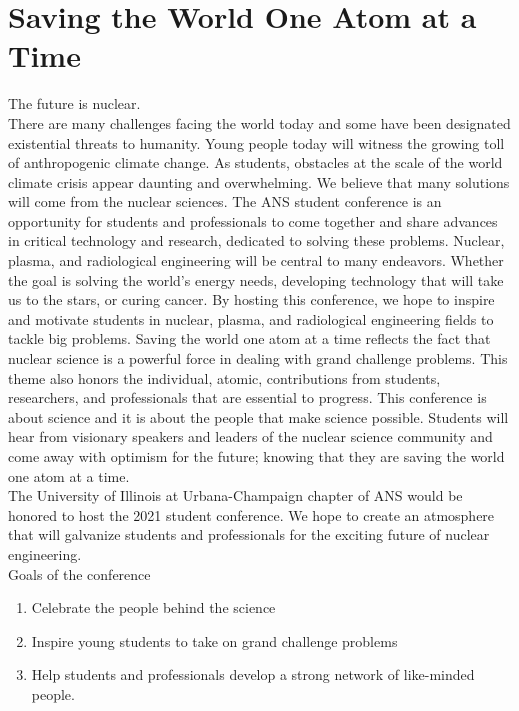 \section{Saving the World One Atom at a Time}
The future is nuclear.\\
There are many challenges facing the world today and some have been designated existential threats to humanity. Young people today will witness the growing toll of anthropogenic climate change. As students, obstacles at the scale of the world climate crisis appear daunting and overwhelming. We believe that many solutions will come from the nuclear sciences. The ANS student conference is an opportunity for students and professionals to come together and share advances in critical technology and research, dedicated to solving these problems. Nuclear, plasma, and radiological engineering will be central to many endeavors. Whether the goal is solving the world’s energy needs, developing technology that will take us to the stars, or curing cancer. By hosting this conference, we hope to inspire and motivate students in nuclear, plasma, and radiological engineering fields to tackle big problems. Saving the world one atom at a time reflects the fact that nuclear science is a powerful force in dealing with grand challenge problems. This theme also honors the individual, atomic, contributions from students, researchers, and professionals that are essential to progress. This conference is about science and it is about the people that make science possible. Students will hear from visionary speakers and leaders of the nuclear science community and come away with optimism for the future; knowing that they are saving the world one atom at a time.\\
The University of Illinois at Urbana-Champaign chapter of ANS would be honored to host the 2021 student conference. We hope to create an atmosphere that will galvanize students and professionals for the exciting future of nuclear engineering.\\

Goals of the conference
\begin{enumerate}
	\item Celebrate the people behind the science
	\item Inspire young students to take on grand challenge problems
	\item Help students and professionals develop a strong network of like-minded people. 
\end{enumerate}
